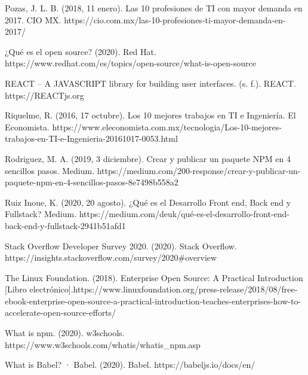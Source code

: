 \begin{thebibliography}{100}
\bibitem{} Pozas, J. L. B. (2018, 11 enero). Las 10 profesiones de TI con mayor demanda en 2017. CIO MX. https://cio.com.mx/las-10-profesiones-ti-mayor-demanda-en-2017/

\bibitem{} ¿Qué es el open source? (2020). Red Hat. https://www.redhat.com/es/topics/open-source/what-is-open-source

 REACT – A JAVASCRIPT library for building user interfaces. (s. f.). REACT. https://REACTjs.org

 Riquelme, R. (2016, 17 octubre). Los 10 mejores trabajos en TI e Ingeniería. El Economista. https://www.eleconomista.com.mx/tecnologia/Los-10-mejores-trabajos-en-TI-e-Ingenieria-20161017-0053.html

 Rodriguez, M. A. (2019, 3 diciembre). Crear y publicar un paquete NPM en 4 sencillos pasos. Medium. https://medium.com/200-response/crear-y-publicar-un-paquete-npm-en-4-sencillos-pasos-8e7498b558a2

 Ruiz Inoue, K. (2020, 20 agosto). ¿Qué es el Desarrollo Front end, Back end y Fullstack? Medium. https://medium.com/deuk/qué-es-el-desarrollo-front-end-back-end-y-fullstack-2941b51afd1

 Stack Overflow Developer Survey 2020. (2020). Stack Overflow. https://insights.stackoverflow.com/survey/2020#overview

 The Linux Foundation. (2018). Enterprise Open Source: A Practical Introduction [Libro electrónico].https://www.linuxfoundation.org/press-release/2018/08/free-ebook-enterprise-open-source-a-practical-introduction-teaches-enterprises-how-to-accelerate-open-source-efforts/

 What is npm. (2020). w3schools. https://www.w3schools.com/whatis/whatis_npm.asp

 What is Babel? · Babel. (2020). Babel. https://babeljs.io/docs/en/



\end{thebibliography}